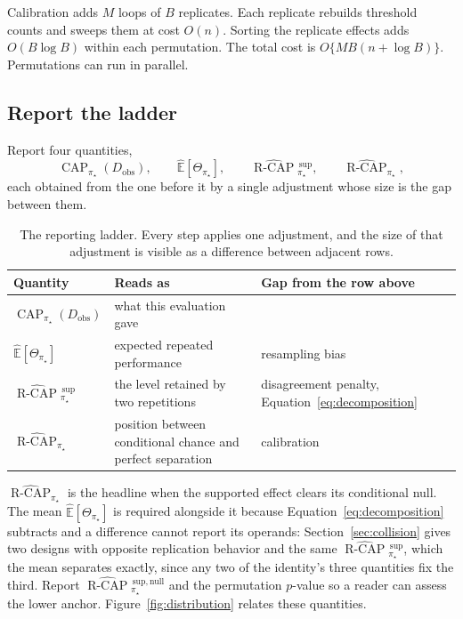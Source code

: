 \documentclass[11pt]{article}
\newcommand{\CAP}{\operatorname{CAP}}
\newcommand{\Tpi}{\CAP_{\pi_\star}}
\newcommand{\E}{\mathbb{E}}
\newcommand{\RCAPHat}{\widehat{\operatorname{R\text{-}CAP}}{}^{\,\mathrm{sup}}_{\pi_\star}}
\newcommand{\RCAPnullHat}{\widehat{\operatorname{R\text{-}CAP}}{}^{\,\mathrm{sup,null}}_{\pi_\star}}
\newcommand{\RCAPcalHat}{\widehat{\operatorname{R\text{-}CAP}}_{\pi_\star}}
\theoremstyle{remark}
\begin{document}
Calibration adds $M$ loops of $B$ replicates. Each replicate rebuilds threshold counts and sweeps them at cost $O(n)$. Sorting the replicate effects adds $O(B\log B)$ within each permutation. The total cost is $O\{MB(n+\log B)\}$. Permutations can run in parallel.

\subsection{Report the ladder}
\label{sec:reporting}

Report four quantities,
\[
\Tpi(D_{\mathrm{obs}}),
\qquad
\widehat{\E}[\Theta_{\pi_\star}],
\qquad
\RCAPHat,
\qquad
\RCAPcalHat ,
\]
each obtained from the one before it by a single adjustment whose size is the gap between them.

\begin{table}[ht]
\centering
\caption{The reporting ladder. Every step applies one adjustment, and the size of that adjustment is visible as a difference between adjacent rows.}
\label{tab:ladder}
\begin{tabularx}{\textwidth}{@{}>{\raggedright\arraybackslash}p{}>{\raggedright\arraybackslash}X>{\raggedright\arraybackslash}p{}@{}}
\toprule
Quantity & Reads as & Gap from the row above \\
\midrule
$\Tpi(D_{\mathrm{obs}})$ & what this evaluation gave & \\
$\widehat{\E}[\Theta_{\pi_\star}]$ & expected repeated performance & resampling bias \\
$\RCAPHat$ & the level retained by two repetitions & disagreement penalty, Equation~\eqref{eq:decomposition} \\
$\RCAPcalHat$ & position between conditional chance and perfect separation & calibration \\
\bottomrule
\end{tabularx}
\end{table}

$\RCAPcalHat$ is the headline when the supported effect clears its conditional null. The mean $\widehat{\E}[\Theta_{\pi_\star}]$ is required alongside it because Equation~\eqref{eq:decomposition} subtracts and a difference cannot report its operands: Section~\ref{sec:collision} gives two designs with opposite replication behavior and the same $\RCAPHat$, which the mean separates exactly, since any two of the identity's three quantities fix the third. Report $\RCAPnullHat$ and the permutation $p$-value so a reader can assess the lower anchor. Figure~\ref{fig:distribution} relates these quantities.
\end{document}
